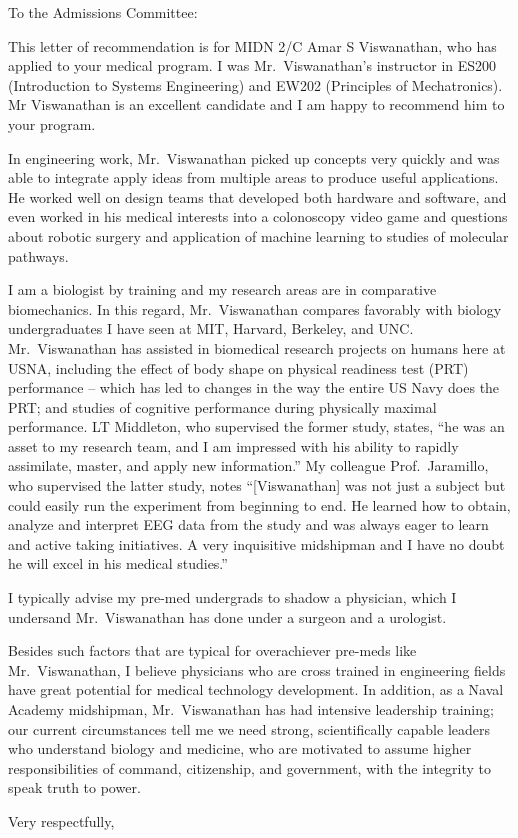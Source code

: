 \documentclass[11pt]{wrceletter}
\date{\today}
\begin{document}
\begin{letter}{%
}

\opening{To the Admissions Committee:}
\raggedright %
\setlength{\parindent}{15pt} %

This letter of recommendation is for MIDN 2/C Amar S Viswanathan, who has applied to your medical program. I was Mr.~Viswanathan's instructor in ES200 (Introduction to Systems Engineering) and EW202 (Principles of Mechatronics). Mr Viswanathan is an excellent candidate and I am happy to recommend him to your program. 

In engineering work, Mr.~Viswanathan picked up concepts very quickly and was able to integrate apply ideas from multiple areas to produce useful applications. He worked well on design teams that developed both hardware and software, and even worked in his medical interests into a colonoscopy video game and questions about robotic surgery and application of machine learning to studies of molecular pathways. 

I am a biologist by training and my research areas are in comparative biomechanics. In this regard, Mr.~Viswanathan compares favorably with biology undergraduates I have seen at MIT, Harvard, Berkeley, and UNC. Mr.~Viswanathan has assisted in biomedical research projects on humans here at USNA, including the effect of body shape on physical readiness test (PRT) performance -- which has led to changes in the way the entire US Navy does the PRT; and studies of cognitive performance during physically maximal performance. LT Middleton, who supervised the former study, states, ``he was an asset to my research team, and I am impressed with his ability to rapidly assimilate, master, and apply new information.'' My colleague Prof.~Jaramillo, who supervised the latter study, notes ``[Viswanathan] was not just a subject but could easily run the experiment from beginning to end. He learned how to obtain, analyze and interpret EEG data from the study and was always eager to learn and active taking initiatives. A very inquisitive midshipman and I have no doubt he will excel in his medical studies.'' 

I typically advise my pre-med undergrads to shadow a physician, which I undersand Mr.~Viswanathan has done under a surgeon and a urologist.

Besides such factors that are typical for overachiever pre-meds like Mr.~Viswanathan, I believe physicians who are cross trained in engineering fields have great potential for medical technology development. In addition, as a Naval Academy midshipman, Mr.~Viswanathan has had intensive leadership training; our current circumstances tell me we need strong, scientifically capable leaders who understand biology and medicine, who are motivated to assume higher responsibilities of command, citizenship, and government, with the integrity to speak truth to power. 

\closing{Very respectfully,} %

\end{letter}
\end{document}
